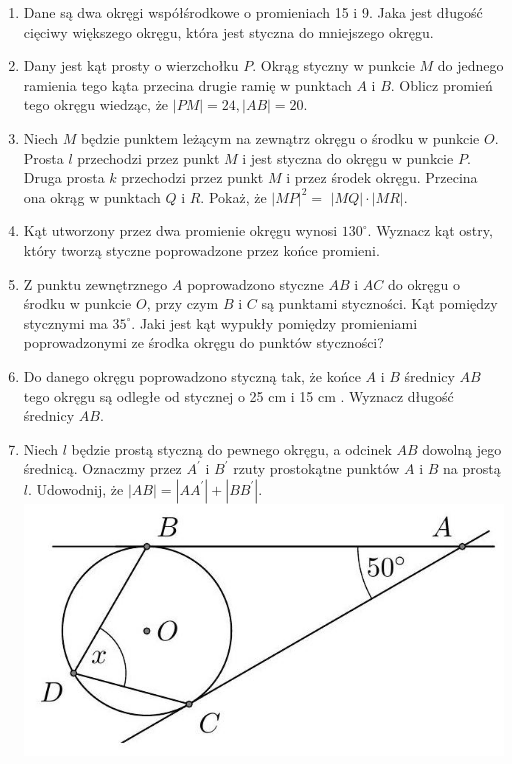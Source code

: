 \documentclass[10pt]{article}
\begin{document}
\begin{enumerate}
  \item Dane są dwa okręgi współśrodkowe o promieniach 15 i 9. Jaka jest długość cięciwy większego okręgu, która jest styczna do mniejszego okręgu.
  \item Dany jest kąt prosty o wierzchołku \(P\). Okrąg styczny w punkcie \(M\) do jednego ramienia tego kąta przecina drugie ramię w punktach \(A\) i \(B\). Oblicz promień tego okręgu wiedząc, że \(|P M|=24,|A B|=20\).
  \item Niech \(M\) będzie punktem leżącym na zewnątrz okręgu o środku w punkcie \(O\). Prosta \(l\) przechodzi przez punkt \(M\) i jest styczna do okręgu w punkcie \(P\). Druga prosta \(k\) przechodzi przez punkt \(M\) i przez środek okręgu. Przecina ona okrąg w punktach \(Q\) i \(R\). Pokaż, że \(|M P|^{2}=\) \(|M Q| \cdot|M R|\).
  \item Kąt utworzony przez dwa promienie okręgu wynosi \(130^{\circ}\). Wyznacz kąt ostry, który tworzą styczne poprowadzone przez końce promieni.
  \item Z punktu zewnętrznego \(A\) poprowadzono styczne \(A B\) i \(A C\) do okręgu o środku w punkcie \(O\), przy czym \(B\) i \(C\) są punktami styczności. Kąt pomiędzy stycznymi ma \(35^{\circ}\). Jaki jest kąt wypukły pomiędzy promieniami poprowadzonymi ze środka okręgu do punktów styczności?
  \item Do danego okręgu poprowadzono styczną tak, że końce \(A\) i \(B\) średnicy \(A B\) tego okręgu są odległe od stycznej o 25 cm i 15 cm . Wyznacz długość średnicy \(A B\).
  \item Niech \(l\) będzie prostą styczną do pewnego okręgu, a odcinek \(A B\) dowolną jego średnicą. Oznaczmy przez \(A^{\prime}\) i \(B^{\prime}\) rzuty prostokątne punktów \(A\) i \(B\) na prostą \(l\). Udowodnij, że \(|A B|=\left|A A^{\prime}\right|+\left|B B^{\prime}\right|\).\\
\includegraphics[max width=\textwidth, center]{2024_11_21_e9b4faa005d5be2cc318g-034}

\end{enumerate}
\end{document}
